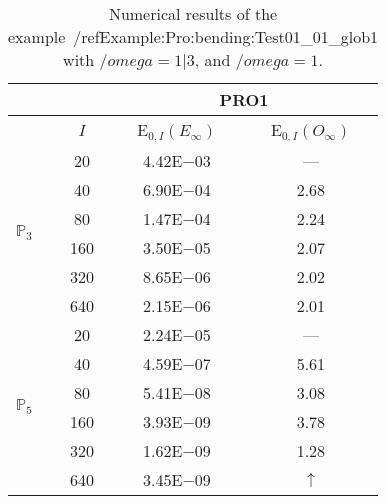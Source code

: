 \begin{table}[H]
\caption{Numerical results of the example~/ref{Example:Pro:bending:Test01_01_glob1} with $/omega=1|3$, and $/omega=1$.}
\setlength{\tabcolsep}{5pt}
\centering
\begin{tabular}{@{}l c c c@{}}
\toprule
 &  & \multicolumn{2}{c}{PRO1}\\
\midrule
 & $I$ & E$_{0,I}(E_{\infty})$ & E$_{0,I}(O_{\infty})$\\
\midrule
\multirow{6}{*}{$\mathbb{P}_{3}$}
 & 20 & 4.42E$-$03 & ---\\
 & 40 & 6.90E$-$04 & 2.68\\
 & 80 & 1.47E$-$04 & 2.24\\
 & 160 & 3.50E$-$05 & 2.07\\
 & 320 & 8.65E$-$06 & 2.02\\
 & 640 & 2.15E$-$06 & 2.01\\
\midrule
\multirow{6}{*}{$\mathbb{P}_{5}$}
 & 20 & 2.24E$-$05 & ---\\
 & 40 & 4.59E$-$07 & 5.61\\
 & 80 & 5.41E$-$08 & 3.08\\
 & 160 & 3.93E$-$09 & 3.78\\
 & 320 & 1.62E$-$09 & 1.28\\
 & 640 & 3.45E$-$09 & $\uparrow$\\
\bottomrule
\end{tabular}
\label{Table:PRO:test_01_01_test28_pro1}
\end{table}
